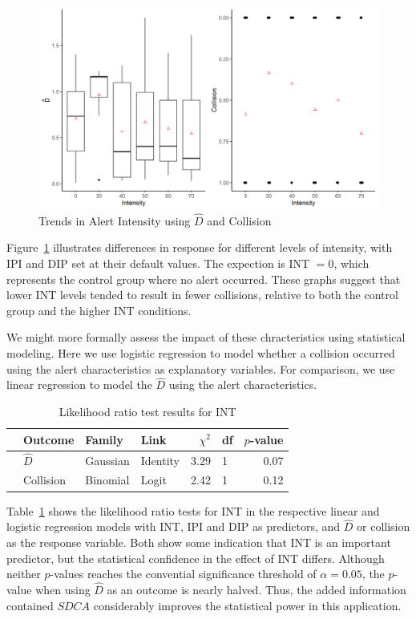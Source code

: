 \documentclass{article}
\begin{document}
\begin{figure}[h!]
\includegraphics[width=\textwidth]{fig3.png}
\caption{Trends in Alert Intensity using $\hat{D}$ and Collision}
\label{figure 3}
\end{figure}

Figure~\ref{figure 3} illustrates differences in response for different levels of intensity, with IPI and DIP set at their default values.  The expection is INT $=0$, which represents the control group where no alert occurred.  These graphs suggest that lower INT levels tended to result in fewer collisions, relative to both the control group and the higher INT conditions.

We might more formally assess the impact of these chracteristics using statistical modeling.  Here we use logistic regression to model whether a collision occurred using the alert characteristics as explanatory variables.  For comparison, we use linear regression to model the $\hat{D}$ using the alert characteristics.

\begin{table}[hbt]
\centering
\begin{tabular}{rlllrlr}
  \hline
 & Outcome & Family & Link & $\chi^2$ & df & $p$-value \\ 
  \hline
 & $\hat{D} $ & Gaussian & Identity & 3.29 & 1 & 0.07 \\ 
  & Collision & Binomial & Logit & 2.42 & 1 & 0.12 \\ 
   \hline
\end{tabular}
\caption{Likelihood ratio test results for INT}
\label{table 1}
\end{table}


Table~\ref{table 1} shows the likelihood ratio tests for INT in the respective linear and logistic regression models with INT, IPI and DIP as predictors, and $\hat{D}$ or collision as the response variable. Both show some indication that INT is an important predictor, but the statistical confidence in the effect of INT differs. Although neither $p$-values reaches the convential significance threshold of $\alpha = 0.05$, the $p$-value when using $\hat{D}$ as an outcome is nearly halved.  Thus, the added information contained $SDCA$ considerably improves the statistical power in this application.
\end{document}
